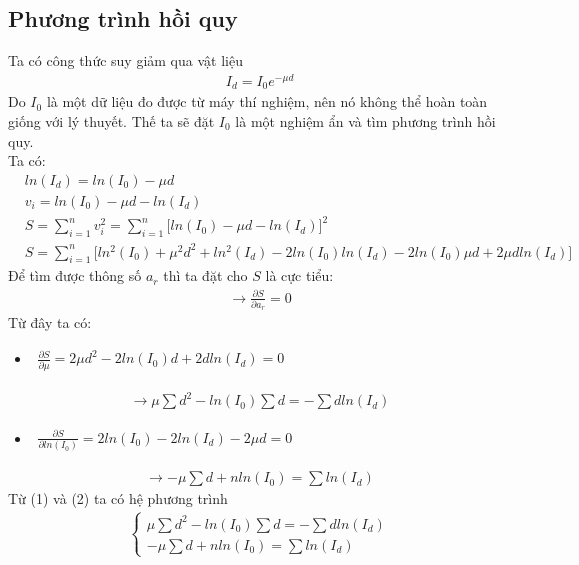 \documentclass{article}
\begin{document}
\setcounter{section}{1}

\subsection{Phương trình hồi quy}
Ta có công thức suy giảm qua vật liệu
\begin{align*}
	I_d = I_0e^{-\mu d}
\end{align*}
Do $I_0$ là một dữ liệu đo được từ máy thí nghiệm, nên nó không thể hoàn toàn giống với lý thuyết. Thế ta sẽ đặt $I_0$ là một nghiệm ẩn và tìm phương trình hồi quy. \\
Ta có:
\begin{align*}
	& ln(I_d) = ln(I_0) - \mu d \\
	& v_i = ln(I_0) - \mu d - ln(I_d) \\
	& S = \sum_{i=1}^{n}v_i^2 =\sum_{i=1}^{n}\Big[ ln(I_0) - \mu d - ln(I_d) \Big]^2 \\
	& S = \sum_{i=1}^{n}\Big[ln^2(I_0) + \mu^2d^2 + ln^2(I_d) - 2ln(I_0)ln(I_d) - 2ln(I_0)\mu d + 2\mu dln(I_d) \Big]
\end{align*}
Để tìm được thông số $a_r$ thì ta đặt cho $S$ là cực tiểu:
\begin{align*}
	\rightarrow \frac{\partial S}{\partial a_r} = 0
\end{align*}
Từ đây ta có:
\begin{itemize} 
	\item $\begin{aligned}
				 \frac{\partial S}{\partial \mu} = 2\mu d^2 - 2ln(I_0)d + 2dln(I_d) = 0
\end{aligned}$
\end{itemize}
\begin{align}
	\rightarrow \mu \sum{d^2} - ln(I_0)\sum{d} = - \sum{dln(I_d)}
\end{align}
\begin{itemize} 
	\item $\begin{aligned}
				 \frac{\partial S}{\partial ln(I_0)} = 2ln(I_0) - 2ln(I_d) - 2\mu d = 0
\end{aligned}$
\end{itemize}
\begin{align}
	\rightarrow -\mu \sum{d} + nln(I_0) =  \sum{ln(I_d)}
\end{align}
Từ (1) và (2) ta có hệ phương trình
\begin{align}
	\begin{cases}
	\mu \sum{d^2} - ln(I_0)\sum{d} = - \sum{dln(I_d)} \\ 
	-\mu \sum{d} + nln(I_0) =  \sum{ln(I_d)} 
	\end{cases}
\end{align}
\vspace{0.5cm}
\end{document}
